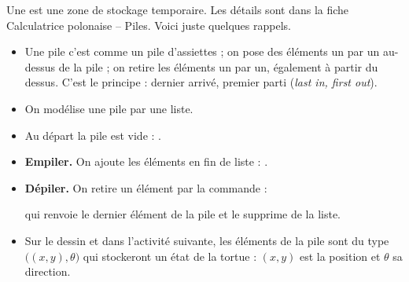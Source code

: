 \documentclass[11pt,class=report,crop=false]{standalone}
\begin{document}
\begin{cours}[Piles]
Une  est une zone de stockage temporaire. Les détails sont dans la fiche \og{}Calculatrice polonaise -- Piles\fg{}. Voici juste quelques rappels.



\begin{itemize}
  \item Une pile c'est comme un pile d'assiettes ; on pose des éléments un par un au-dessus de la pile ; on retire les éléments un par un, également à partir du dessus. C'est le principe : \og{}dernier arrivé, premier parti\fg{} (\emph{last in, first out}).
  
  \item On modélise une pile par une liste. 
  \item Au départ la pile est vide : .
  \item \textbf{Empiler.} On ajoute les éléments en fin de liste : .
  \item \textbf{Dépiler.} On retire un élément par la commande  :  
  
  qui renvoie le dernier élément de la pile et le supprime de la liste.
  
  \item Sur le dessin et dans l'activité suivante, les éléments de la pile sont du type $\big((x,y),\theta\big)$  qui stockeront un état de la tortue : $(x,y)$ est la position et $\theta$ sa direction.
  
\end{itemize}

\end{cours}


\end{document}
